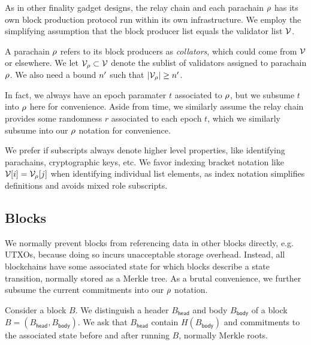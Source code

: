 As in other finality gadget designs, the relay chain and each parachain $\rho$ has its own block production protocol run within its own infrastructure.  We employ the simplifying assumption that the block producer list equals the validator list $\mathcal{V}$.  


A parachain $\rho$ refers to its block producers as {\em collators}, which could come from $\mathcal{V}$ or elsewhere.  We let $\mathcal{V}_{\rho} \subset \mathcal{V}$ denote the sublist of validators assigned to parachain $\rho$.  We also need a bound $n'$ such that $|\mathcal{V}_{\rho}| \ge n'$.

In fact, we always have an epoch paramater $t$ associated to $\rho$, but we subsume $t$ into $\rho$ here for convenience.  Aside from time, we similarly assume the relay chain provides some randomness $r$ associated to each epoch $t$, which we similarly subsume into our $\rho$ notation for convenience.

We prefer if subscripts always denote higher level properties, like identifying parachains, cryptographic keys, etc.  We favor indexing bracket notation like $\mathcal{V}[i] = \mathcal{V}_{\rho}[j]$ when identifying individual list elements, as index notation simplifies definitions and avoids mixed role subscripts. 

\subsection{Blocks}

We normally prevent blocks from referencing data in other blocks directly, e.g. UTXOs, because doing so incurs unacceptable storage overhead.  Instead, all blockchains have some associated state for which blocks describe a state transition, normally stored as a Merkle tree.  As a brutal convenience, we further subsume the current commitments into our $\rho$ notation.

Consider a block $B$.  We distinguish a header $B_{\mathsf{head}}$ and body $B_{\mathsf{body}}$ of a block $B = (B_{\mathsf{head}},B_{\mathsf{body}})$.  We ask that $B_{\mathsf{head}}$ contain $H(B_{\mathsf{body}})$ and commitments to the associated state before and after running $B$, normally Merkle roots.  

